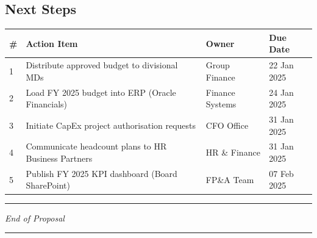 \subsection{Next Steps}

\begin{tcolorbox}[
  enhanced,
  colback=CoolGray,
  colframe=TealAccent,
  boxrule=0.8pt,
  arc=4pt,
  left=10pt, right=10pt, top=8pt, bottom=8pt,
  title={\faCheckCircle\; Required Actions Following Board Approval},
  fonttitle=\bfseries\color{NavyPrimary}\small,
  attach boxed title to top left={yshift=-2mm, xshift=6pt},
  boxed title style={colback=TealAccent!15, colframe=TealAccent, boxrule=0.6pt, arc=3pt}
]
\vspace{2pt}
\renewcommand{\arraystretch}{1.25}
\begin{tabular}{C{0.5cm} L{7.0cm} L{3.0cm} C{1.8cm}}
  \textbf{\#} & \textbf{Action Item} & \textbf{Owner} & \textbf{Due Date} \\
   & Distribute approved budget to divisional MDs           & Group Finance  & 22 Jan 2025 \\
  2 & Load FY 2025 budget into ERP (Oracle Financials)       & Finance Systems & 24 Jan 2025 \\
  3 & Initiate CapEx project authorisation requests          & CFO Office     & 31 Jan 2025 \\
  4 & Communicate headcount plans to HR Business Partners    & HR \& Finance  & 31 Jan 2025 \\
  5 & Publish FY 2025 KPI dashboard (Board SharePoint)       & FP\&A Team     & 07 Feb 2025 \\
\end{tabular}
\end{tcolorbox}

\vspace{12pt}

\begin{center}
{\small\color{SlateGray}
  \rule{4cm}{0.4pt}\quad
  \textit{End of Proposal}\quad
  \rule{4cm}{0.4pt}
}
\end{center}
